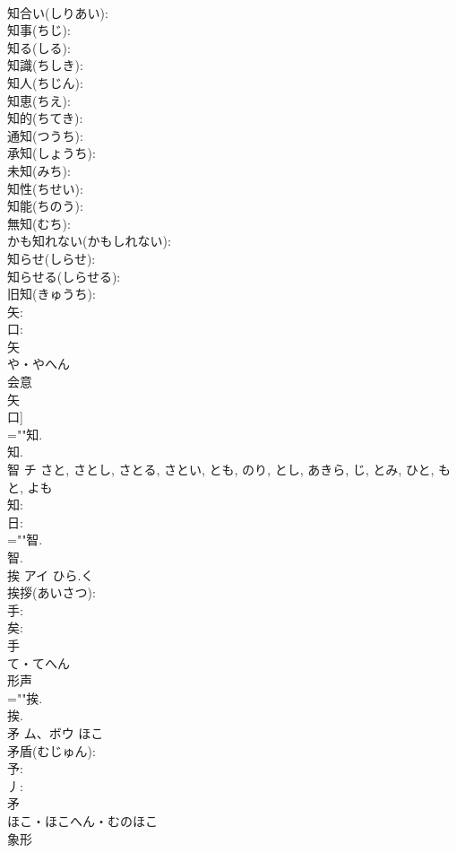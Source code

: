 \documentclass[8pt]{extreport}
\begin{document}
\begin{CJK}{UTF8}{min}
\\	知合い(しりあい): 
\\	知事(ちじ): 
\\	知る(しる): 
\\	知識(ちしき): 
\\	知人(ちじん): 
\\	知恵(ちえ): 
\\	知的(ちてき): 
\\	通知(つうち): 
\\	承知(しょうち): 
\\	未知(みち): 
\\	知性(ちせい): 
\\	知能(ちのう): 
\\	無知(むち): 
\\	かも知れない(かもしれない): 
\\	知らせ(しらせ): 
\\	知らせる(しらせる): 
\\	旧知(きゅうち): 
\\	矢: 
\\	口: 
\\	矢	
\\	や・やへん	
\\	会意 
\\	矢 
\\	口] 
\\	=""知.
\\	知.
\\	智	チ		さと, さとし, さとる, さとい, とも, のり, とし, あきら, じ, とみ, ひと, もと, よも	
\\	知: 
\\	日: 
\\	=""智.
\\	智.
\\	挨	アイ	ひら.く		
\\	挨拶(あいさつ): 
\\	手: 
\\	矣: 
\\	手	
\\	て・てへん	
\\	形声 
\\	=""挨.
\\	挨.
\\	矛	ム、ボウ	ほこ		
\\	矛盾(むじゅん): 
\\	予: 
\\	丿: 
\\	矛	
\\	ほこ・ほこへん・むのほこ	
\\	象形 

\end{CJK}
\end{document}
